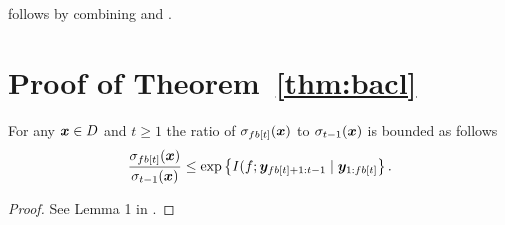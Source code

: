 \noindent{} follows by combining 
and .

\section{Proof of Theorem~\ref*{thm:bacl}} \label{sect:app_bacl}
\begin{lemma}
\label{lem:cmi}
For any $\bm{x} \in D$ and $t \geq 1$
the ratio of $\sigma_{fb[t]}(\bm{x})$ to $\sigma_{t-1}(\bm{x})$ is bounded
as follows
\begin{align*}
\frac{\sigma_{fb[t]}(\bm{x})}{\sigma_{t-1}(\bm{x})} \leq \exp\left\{I(f; \bm{y}_{fb[t]+1:t-1} \mid \bm{y}_{1:fb[t]}\right\}.
\end{align*}
\end{lemma}
\begin{proof}
See Lemma 1 in \cite{desautels12}.
\end{proof}

